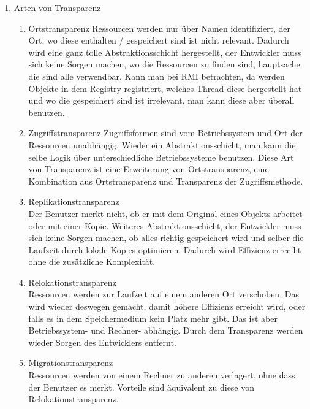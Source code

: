 \begin{enumerate}
\begin{enumerate}
\end{enumerate}

\item Arten von Transparenz \\

\begin{enumerate}
    
\item Ortstransparenz
Ressourcen werden nur über Namen identifiziert, der Ort, wo diese enthalten / gespeichert sind ist nicht relevant. Dadurch wird eine ganz tolle Abstraktionsschicht hergestellt, der Entwickler muss sich keine Sorgen machen, wo die Ressourcen zu finden sind, hauptsache die sind alle verwendbar. Kann man bei RMI betrachten, da werden Objekte in dem Registry registriert, welches Thread diese hergestellt hat und wo die gespeichert sind ist irrelevant, man kann diese aber überall benutzen.

\item Zugriffstransparenz
Zugriffsformen sind vom Betriebssystem und Ort der Ressourcen unabhängig. Wieder ein Abstraktionsschicht, man kann die selbe Logik über unterschiedliche Betriebssysteme benutzen. Diese Art von Transparenz ist eine Erweiterung von Ortstransparenz, eine Kombination aus Ortstransparenz und Transparenz der Zugriffsmethode.

\item Replikationstransparenz \\
Der Benutzer merkt nicht, ob er mit dem Original eines Objekts arbeitet oder mit einer Kopie. Weiteres Abstraktionsschicht, der Entwickler muss sich keine Sorgen machen, ob alles richtig gespeichert wird und selber die Laufzeit durch lokale Kopies optimieren. Dadurch wird Effizienz erreciht ohne die zusätzliche Komplexität.

\item Relokationstransparenz \\
Ressourcen werden zur Laufzeit auf einem anderen Ort verschoben. Das wird wieder deswegen gemacht, damit höhere Effizienz erreicht wird, oder falls es in dem Speichermedium kein Platz mehr gibt. Das ist aber Betriebssystem- und Rechner- abhängig. Durch dem Transparenz werden wieder Sorgen des Entwicklers entfernt.

\item Migrationstransparenz \\
Ressourcen werden von einem Rechner zu anderen verlagert, ohne dass der Benutzer es merkt. Vorteile sind äquivalent zu diese von Relokationstransparenz.


\end{enumerate}
\end{enumerate}
